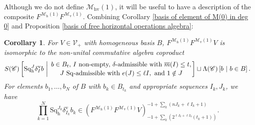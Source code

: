 \documentclass[11pt]{amsart} \renewcommand{\baselinestretch}{1.2}
\theoremstyle{plain}
\newtheorem{cor}[thm]{Corollary}
\theoremstyle{definition}
\newcommand{\scrC}{\mathscr{C}}
\newcommand{\calV}{\mathcal{V}}
\newcommand{\calMv}{\mathcal{M}\dver}
\newcommand{\calMh}{\mathcal{M}\dhor}
\newcommand{\calMhv}{\mathcal{M}_\mathrm{hv}}
\newcommand{\CommOperad}{{\scrC}}
\newcommand{\vect}[2]{\calV^{#1}_{#2}}
\newcommand{\minDimP}{\overline{m}}
\newcommand{\excess}{e}
\newcommand{\Sq}{\mathrm{Sq}}
\newcommand{\uver}{^\mathrm{v}}
\newcommand{\dver}{_\mathrm{v}}
\newcommand{\dhor}{_\mathrm{h}}
\newcommand{\deltav}{\delta\uver}
\begin{document}
\begin{Cohomology Operations for W and U}
Although we do not define $\calMhv(1)$, it will be useful to have a description of the composite $F^{\calMh(1)}F^{\calMv(1)}$.
Combining Corollary \ref{basis of element of M(0) in deg 0} and Proposition \ref{basis of free horizontal operations algebra}:

\begin{cor}
\label{calMhv(1) description}
For $V\in\vect{}{+}$ with homogeneous basis $B$, $F^{\calMh(1)}F^{\calMv(1)} V$ is isomorphic to the non-unital commutative algebra coproduct
\[S(\CommOperad) \left[\Sq\dhor^J\deltav_Ib\ \middle|\ \genfrac{}{}{0pt}{}{b\in B_t\textup{, $I$ non-empty, $\delta$-admissible with }\minDimP(I)\leq t,}{\textup{$J$ $\Sq$-admissible with }\excess(J)\leq \ell I,\textup{ and }1\notin J}\right]\sqcup \Lambda(\CommOperad)\left[b\ \middle|\ b\in B\right].\]
For elements $b_1,\ldots,b_N$ of $B$ with $b_k\in B_{t_k}$ and appropriate sequences $I_k,J_k$, we have
\[\textstyle\prod_{k=1}^N \Sq\dhor^{J_k}\deltav_{I_k}b_k\in \left(F^{\calMh(1)}F^{\calMv(1)}V\right)^{-1+\sum_k(nJ_k+\ell I_k+1)}_{-1+\sum_k(2^{\ell J_k+\ell I_k}(t_k+1))}.\]
\end{cor}




\end{Cohomology Operations for W and U}
\end{document}
